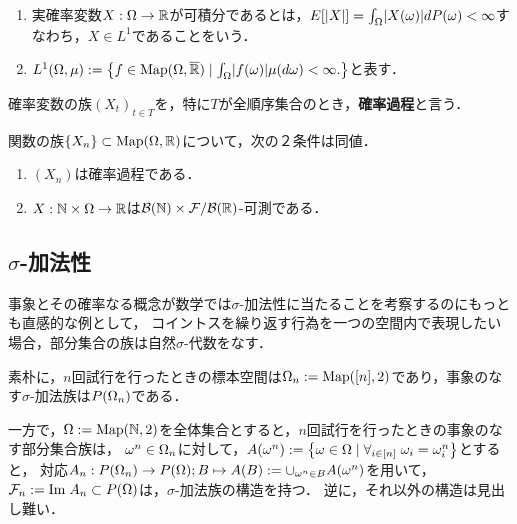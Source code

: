 \documentclass[uplatex,dvipdfmx]{jsreport}
\begin{document}
\begin{definition}[可積分]\mbox{}
    \begin{enumerate}
        \item 実確率変数$X:\Omega\to\mathbb{R}$が可積分であるとは，$E[\lvert X\rvert]=\int_{\Omega}\lvert X(\omega)\rvert dP(\omega)<\infty$すなわち，$X\in L^1$であることをいう．
        \item $L^1(\Omega,\mu):=\left\{f\in\mathrm{Map}(\Omega,\overline{\mathbb{R}})\mid\int_\Omega\lvert f(\omega)\rvert\mu(d\omega)<\infty.\right\}$と表す．
    \end{enumerate}
\end{definition}

\begin{definition}
    確率変数の族$(X_t)_{t\in T}$を，特に$T$が全順序集合のとき，\textbf{確率過程}と言う．
\end{definition}

\begin{lemma}
    関数の族$\{X_n\}\subset\mathrm{Map}(\Omega,\mathbb{R})$について，次の２条件は同値．
    \begin{enumerate}
        \item $(X_n)$は確率過程である．
        \item $X:\mathbb{N}\times\Omega\to\mathbb{R}$は$\mathcal{B}(\mathbb{N})\times\mathcal{F}/\mathcal{B}(\mathbb{R})$-可測である．
    \end{enumerate}
\end{lemma}

\subsection{$\sigma$-加法性}

\begin{tcolorbox}[colframe=ForestGreen, colback=ForestGreen!10!white,breakable,colbacktitle=ForestGreen!40!white,coltitle=black,fonttitle=\bfseries\sffamily,
title=]
    事象とその確率なる概念が数学では$\sigma$-加法性に当たることを考察するのにもっとも直感的な例として，
    コイントスを繰り返す行為を一つの空間内で表現したい場合，部分集合の族は自然$\sigma$-代数をなす．
\end{tcolorbox}

\begin{example}
    素朴に，$n$回試行を行ったときの標本空間は$\Omega_n:=\mathrm{Map}([n],2)$であり，事象のなす$\sigma$-加法族は$P(\Omega_n)$である．

    一方で，$\Omega:=\mathrm{Map}(\mathbb{N},2)$を全体集合とすると，$n$回試行を行ったときの事象のなす部分集合族は，
    $\omega^n\in\Omega_n$に対して，$A(\omega^n):=\left\{\omega\in\Omega\mid\forall_{i\in[n]}\;\omega_i=\omega_i^n\right\}$とすると，
    対応$A_n:P(\Omega_n)\to P(\Omega);B\mapsto A(B):=\cup_{\omega^n\in B}A(\omega^n)$を用いて，$\mathcal{F}_n:=\mathrm{Im}\; A_n\subset P(\Omega)$は，$\sigma$-加法族の構造を持つ．
    逆に，それ以外の構造は見出し難い．
\end{example}
\end{document}

